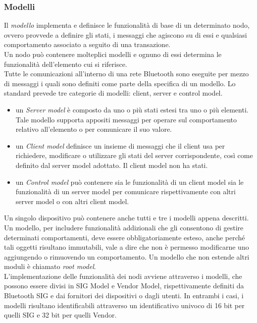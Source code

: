 \subsubsection{Modelli}
\label{subsub:modelli}
Il \textit{modello} implementa e definisce le funzionalità di base di un determinato nodo, ovvero provvede a definire gli stati, i messaggi che agiscono su di essi e qualsiasi comportamento associato a seguito di una transazione.\\
Un nodo può contenere molteplici modelli e ognuno di essi determina le funzionalità dell'elemento cui si riferisce.\\
Tutte le comunicazioni all'interno di una rete Bluetooth sono eseguite per mezzo di messaggi i quali sono definiti come parte della specifica di un modello. Lo standard prevede tre categorie di modelli: client, server e control model.

\begin{itemize}
    \item un \textit{Server model} è composto da uno o più stati estesi tra uno o più elementi. Tale modello supporta appositi messaggi per operare sul comportamento relativo all'elemento o per comunicare il suo valore.
    
    \item un \textit{Client model} definisce un insieme di messaggi che il client usa per richiedere, modificare o utilizzare gli stati del server corrispondente, così come definito dal server model adottato. Il client model non ha stati.
    
    \item un \textit{Control model} può contenere sia le funzionalità di un client model sia le funzionalità di un server model per comunicare rispettivamente con altri server model o con altri client model.
\end{itemize}
Un singolo dispositivo può contenere anche tutti e tre i modelli appena descritti. 
Un modello, per includere funzionalità addizionali che gli consentono di gestire determinati comportamenti, deve essere obbligatoriamente esteso, anche perché tali oggetti risultano immutabili, vale a dire che non è permesso modificarne uno aggiungendo o rimuovendo un comportamento.
Un modello che non estende altri moduli è chiamato \textit{root model}.\\
L'implementazione delle funzionalità dei nodi avviene attraverso i modelli, che possono essere divisi in SIG Model e Vendor Model, rispettivamente definiti da Bluetooth SIG e dai fornitori dei dispositivi o dagli utenti. In entrambi i casi, i modelli risultano identificabili attraverso un identificativo univoco di 16 bit per quelli SIG e 32 bit per quelli Vendor.

